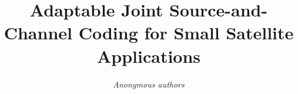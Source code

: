 \documentclass[conference]{IEEEtran}
\begin{document}
\title{Adaptable Joint Source-and-Channel Coding for Small Satellite Applications}

\author{\emph{Anonymous authors}}

\maketitle
\end{document}
